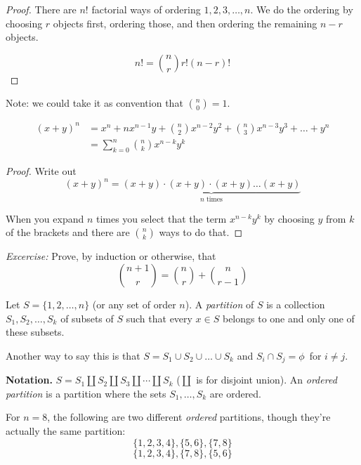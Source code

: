 \documentclass[twoside]{scrartcl}
\begin{document}
\begin{proof}
There are $n!$ factorial ways of ordering $1,2,3,\dots, n$. We do the ordering by choosing $r$ objects first, ordering those, and then ordering the remaining $n-r$ objects. 

\[n! = \binom{n}{r} r! (n-r)! \]
\end{proof}

Note: we could take it as convention that $\binom{n}{0} = 1
$. \\

\begin{proposition}
\[
\begin{aligned}
  (x + y)^n &= x^n + nx^{n-1}y + \binom{n}{2}x^{n-2}y^2 + \binom{n}{3}x^{n-3}y^3 + \dots + y^n\\
  &= \sum_{k=0}^{n} \binom{n}{k} x^{n-k}y^k
\end{aligned}
\]
\end{proposition}

\begin{proof}
Write out
\[(x+y)^n = \underbrace{(x+y) \cdot (x+y) \cdot(x+y) \dots (x+y)}_{n \text{ times}}\]	

When you expand $n$ times you select that the term $x^{n-k}y^k$ by choosing $y$  from $k$ of the brackets and there are $\binom{n}{k}$ ways to do that. 
\end{proof}

\emph{Excercise:} Prove, by induction or otherwise, that 
\[\binom{n+1}{r} = \binom{n}{r} + \binom{n}{r-1}\]


\vspace*{5pt}

\begin{definition}
Let $S = \{1,2,\dots,n\}$ (or any set of order $n$). A \emph{partition} of $S$ is a collection $S_1,S_2,\dots,S_k$ of subsets of $S$ such that every $x \in S$ belongs to one and only one of these subsets. 
\end{definition}

Another way to say this is that $S = S_1 \cup S_2 \cup \dots \cup S_k$ and $S_i \cap S_j = \phi \,$ for $i \neq j$. 


\textbf{Notation.} $S = S_1\coprod S_2 \coprod S_3 \coprod \cdots \coprod S_k $ ($\coprod$ is for disjoint union). An \emph{ordered partition} is a partition where the sets $S_1,\dots,S_k$ are ordered. \\

\begin{example}
For $n = 8$, the following are two different \emph{ordered} partitions, though they're actually the same partition: 
\[\{1,2,3,4\}, \{5,6\}, \{7,8\}\]	
\[\{1,2,3,4\}, \{7,8\}, \{5,6\}\]	
\end{example}\vspace*{5pt}
\end{document}
